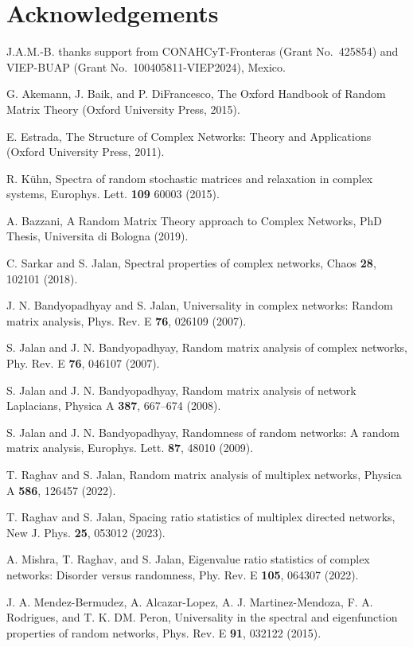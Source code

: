 \section*{Acknowledgements}
J.A.M.-B. thanks support from CONAHCyT-Fronteras (Grant No.~425854) 
and VIEP-BUAP (Grant No.~100405811-VIEP2024), Mexico.



\begin{thebibliography}{00}

G. Akemann, J. Baik, and P. DiFrancesco,
The Oxford Handbook of Random Matrix Theory
(Oxford University Press, 2015).

E. Estrada,
The Structure of Complex Networks: Theory and Applications
(Oxford University Press, 2011).

R. K\"uhn,
Spectra of random stochastic matrices and relaxation in complex systems,
Europhys. Lett. {\bf 109} 60003 (2015).

A. Bazzani,
A Random Matrix Theory approach to Complex Networks,
PhD Thesis, Universita di Bologna (2019).

C. Sarkar and S. Jalan,
Spectral properties of complex networks,
Chaos {\bf 28}, 102101 (2018).

J. N. Bandyopadhyay and S. Jalan,
Universality in complex networks: Random matrix analysis,
Phys. Rev. E {\bf 76}, 026109 (2007).

S. Jalan and J. N. Bandyopadhyay,
Random matrix analysis of complex networks,
Phy. Rev. E {\bf 76}, 046107 (2007).

S. Jalan and J. N. Bandyopadhyay,
Random matrix analysis of network Laplacians,
Physica A {\bf 387}, 667--674 (2008).

S. Jalan and J. N. Bandyopadhyay,
Randomness of random networks: A random matrix analysis,
Europhys. Lett. {\bf 87}, 48010 (2009).

T. Raghav and S. Jalan,
Random matrix analysis of multiplex networks,
Physica A {\bf 586}, 126457 (2022).

T. Raghav and S. Jalan,
Spacing ratio statistics of multiplex directed networks,
New J. Phys. {\bf 25}, 053012 (2023).

A. Mishra, T. Raghav, and S. Jalan,
Eigenvalue ratio statistics of complex networks: Disorder versus randomness,
Phy. Rev. E {\bf 105}, 064307 (2022).

J. A. Mendez-Bermudez, A. Alcazar-Lopez, A. J. Martinez-Mendoza, F. A. Rodrigues, and T. K. DM. Peron,
Universality in the spectral and eigenfunction properties of random networks,
Phys. Rev. E {\bf 91}, 032122 (2015).


\end{thebibliography}
